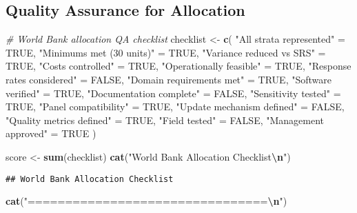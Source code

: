 \documentclass[
]{article}
\newenvironment{Shaded}{\begin{snugshade}}{\end{snugshade}}
\newcommand{\CommentTok}[1]{\textcolor[rgb]{0.56,0.35,0.01}{\textit{#1}}}
\newcommand{\ConstantTok}[1]{\textcolor[rgb]{0.56,0.35,0.01}{#1}}
\newcommand{\FunctionTok}[1]{\textcolor[rgb]{0.13,0.29,0.53}{\textbf{#1}}}
\newcommand{\NormalTok}[1]{#1}
\newcommand{\OtherTok}[1]{\textcolor[rgb]{0.56,0.35,0.01}{#1}}
\newcommand{\SpecialCharTok}[1]{\textcolor[rgb]{0.81,0.36,0.00}{\textbf{#1}}}
\newcommand{\StringTok}[1]{\textcolor[rgb]{0.31,0.60,0.02}{#1}}
\begin{document}
\subsection{Quality Assurance for
Allocation}\label{quality-assurance-for-allocation}

\begin{Shaded}
\begin{Highlighting}[]
\CommentTok{\# World Bank allocation QA checklist}
\NormalTok{checklist }\OtherTok{\textless{}{-}} \FunctionTok{c}\NormalTok{(}
  \StringTok{"All strata represented"} \OtherTok{=} \ConstantTok{TRUE}\NormalTok{,}
  \StringTok{"Minimums met (30 units)"} \OtherTok{=} \ConstantTok{TRUE}\NormalTok{,}
  \StringTok{"Variance reduced vs SRS"} \OtherTok{=} \ConstantTok{TRUE}\NormalTok{,}
  \StringTok{"Costs controlled"} \OtherTok{=} \ConstantTok{TRUE}\NormalTok{,}
  \StringTok{"Operationally feasible"} \OtherTok{=} \ConstantTok{TRUE}\NormalTok{,}
  \StringTok{"Response rates considered"} \OtherTok{=} \ConstantTok{FALSE}\NormalTok{,}
  \StringTok{"Domain requirements met"} \OtherTok{=} \ConstantTok{TRUE}\NormalTok{,}
  \StringTok{"Software verified"} \OtherTok{=} \ConstantTok{TRUE}\NormalTok{,}
  \StringTok{"Documentation complete"} \OtherTok{=} \ConstantTok{FALSE}\NormalTok{,}
  \StringTok{"Sensitivity tested"} \OtherTok{=} \ConstantTok{TRUE}\NormalTok{,}
  \StringTok{"Panel compatibility"} \OtherTok{=} \ConstantTok{TRUE}\NormalTok{,}
  \StringTok{"Update mechanism defined"} \OtherTok{=} \ConstantTok{FALSE}\NormalTok{,}
  \StringTok{"Quality metrics defined"} \OtherTok{=} \ConstantTok{TRUE}\NormalTok{,}
  \StringTok{"Field tested"} \OtherTok{=} \ConstantTok{FALSE}\NormalTok{,}
  \StringTok{"Management approved"} \OtherTok{=} \ConstantTok{TRUE}
\NormalTok{)}

\NormalTok{score }\OtherTok{\textless{}{-}} \FunctionTok{sum}\NormalTok{(checklist)}
\FunctionTok{cat}\NormalTok{(}\StringTok{"World Bank Allocation Checklist}\SpecialCharTok{\textbackslash{}n}\StringTok{"}\NormalTok{)}
\end{Highlighting}
\end{Shaded}

\begin{verbatim}
## World Bank Allocation Checklist
\end{verbatim}

\begin{Shaded}
\begin{Highlighting}[]
\FunctionTok{cat}\NormalTok{(}\StringTok{"================================}\SpecialCharTok{\textbackslash{}n}\StringTok{"}\NormalTok{)}
\end{Highlighting}
\end{Shaded}
\end{document}

